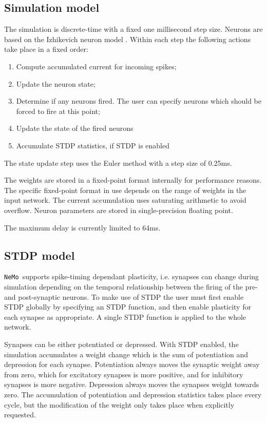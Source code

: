 \documentclass[a4paper]{article}
\newcommand{\nemo}{\texttt{NeMo}}
\begin{document}
\subsection{Simulation model}

The simulation is discrete-time with a fixed one millisecond step size.
Neurons are based on the Izhikevich neuron model \cite{izhikevich2003simple_model}.
Within each step the following actions take place in a fixed order:

\begin{enumerate}
	\item Compute accumulated current for incoming spikes;
	\item Update the neuron state;
	\item Determine if any neurons fired. The user can specify neurons which should be forced to fire at this point;
	\item Update the state of the fired neurons
	\item Accumulate STDP statistics, if STDP is enabled
\end{enumerate}

The state update step uses the Euler method with a step size of 0.25ms. 

The weights are stored in a fixed-point format internally for performance reasons.
The specific fixed-point format in use depends on the range of weights in the input network.
The current accumulation uses saturating arithmetic to avoid overflow.
Neuron parameters are stored in single-precision floating point.

The maximum delay is currently limited to 64ms.

\subsection{STDP model}
\label{stdp}

\nemo\ supports spike-timing dependant plasticity,
	i.e. synapses can change during simulation depending on the temporal relationship 
between the firing of the pre- and post-synaptic neurons. 
To make use of STDP the user must first enable STDP globally by specifying an STDP function,
and then enable plasticity for each synapse as appropriate.
A single STDP function is applied to the whole network.

Synapses can be either potentiated or depressed.
With STDP enabled,
	the simulation accumulates a weight change
	which is the sum of potentiation and depression for each synapse. 
Potentiation always moves the synaptic weight away from zero,
	which for excitatory synapses is more positive,
	and for inhibitory synapses is more negative.
Depression always moves the synapses weight towards zero.
The accumulation of potentiation and depression statistics takes place every cycle,
	but the modification of the weight only takes place when explicitly requested.
\end{document}
